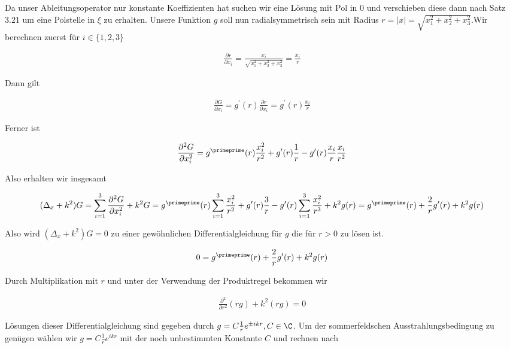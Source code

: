 \begin{solution}

Da unser Ableitungsoperator nur konstante Koeffizienten hat suchen wir eine Lösung mit Pol in $0$ und verschieben diese dann nach Satz $3.21$ um eine Polstelle in $\xi$ zu erhalten.
Unsere Funktion $g$ soll nun radialsymmetrisch sein mit Radius $r = |x| = \sqrt{x_1^2 + x_2^2 +x_3^2}$.Wir berechnen zuerst für $i \in \{1,2,3\}$

\begin{align*}
  \frac{\partial r}{\partial x_i}
  =
  \frac{x_i}{\sqrt{x_1^2 + x_2^2 + x_3^2}}
  =
  \frac{x_i}{r}
\end{align*}

Dann gilt

\begin{align*}
  \frac{\partial G}{\partial x_i}
  =
  g^\prime (r) \frac{\partial r}{\partial x_i}
  =
  g^\prime (r) \frac{x_i}{r}
\end{align*}

Ferner ist

\begin{align*}
  \frac{\partial^2 G}{\partial x_i^2}
  =
  g^\primeprime(r) \frac{x_i^2}{r^2}
    + g^\prime(r) \frac{1}{r}
    - g^\prime(r) \frac{x_i}{r}\frac{x_i}{r^2}
\end{align*}

Also erhalten wir insgesamt

\begin{align*}
  (\Delta_x +k^2) G
  =
  \sum_{i=1}^3 \frac{\partial^2 G}{\partial x_i^2} + k^2 G
  =
  g^\primeprime(r) \sum_{i=1}^3 \frac{x_i^2}{r^2}
    + g^\prime(r) \frac{3}{r}
    - g^\prime(r) \sum_{i=1}^3 \frac{x_i^2}{r^3}
    + k^2 g(r)
  =
  g^\primeprime(r) + \frac{2}{r} g^\prime(r) + k^2g(r)
\end{align*}

Also wird $(\Delta_x +k^2) G = 0$ zu einer gewöhnlichen Differentialgleichung für $g$ die für $r>0$ zu lösen ist.

\begin{align*}
  0 = g^\primeprime(r) + \frac{2}{r} g^\prime(r) + k^2g(r)
\end{align*}

Durch Multiplikation mit $r$ und unter der Verwendung der Produktregel bekommen wir

\begin{align*}
  \frac{\partial^2}{\partial r^2}(rg) + k^2(rg) = 0
\end{align*}

Lösungen dieser Differentialgleichung sind gegeben durch $g = C \frac{1}{r}e^{\pm ikr}, C \in \C$. Um der sommerfeldschen Ausstrahlungsbedingung zu genügen
wählen wir $g = C \frac{1}{r}e^{ikr}$ mit der noch unbestimmten Konstante $C$ und rechnen nach


\end{solution}
